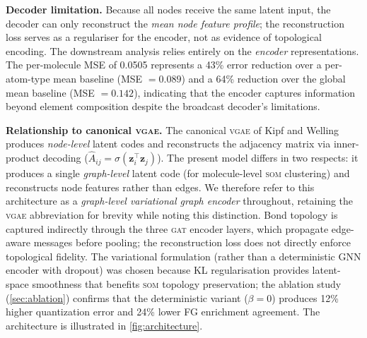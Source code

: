 \documentclass[10pt,a4paper,twocolumn]{article}
\newcommand{\vgae}{\textsc{vgae}}
\newcommand{\gat}{\textsc{gat}}
\newcommand{\som}{\textsc{som}}
\begin{document}
\textbf{Decoder limitation.} Because all nodes receive the same latent input, the decoder can only reconstruct the \emph{mean node feature profile}; the reconstruction loss serves as a regulariser for the encoder, not as evidence of topological encoding. The downstream analysis relies entirely on the \emph{encoder} representations. The per-molecule MSE of 0.0505 represents a 43\% error reduction over a per-atom-type mean baseline (MSE $= 0.089$) and a 64\% reduction over the global mean baseline (MSE $= 0.142$), indicating that the encoder captures information beyond element composition despite the broadcast decoder's limitations.

\textbf{Relationship to canonical \vgae{}.} The canonical \vgae{} of Kipf and Welling~\cite{kipf2016} produces \emph{node-level} latent codes and reconstructs the adjacency matrix via inner-product decoding ($\hat{A}_{ij} = \sigma(\mathbf{z}_i^\top \mathbf{z}_j)$). The present model differs in two respects: it produces a single \emph{graph-level} latent code (for molecule-level \som{} clustering) and reconstructs node features rather than edges. We therefore refer to this architecture as a \emph{graph-level variational graph encoder} throughout, retaining the \vgae{} abbreviation for brevity while noting this distinction. Bond topology is captured indirectly through the three \gat{} encoder layers, which propagate edge-aware messages before pooling; the reconstruction loss does not directly enforce topological fidelity. The variational formulation (rather than a deterministic GNN encoder with dropout) was chosen because KL regularisation provides latent-space smoothness that benefits \som{} topology preservation; the ablation study (\cref{sec:ablation}) confirms that the deterministic variant ($\beta = 0$) produces 12\% higher quantization error and 24\% lower FG enrichment agreement. The architecture is illustrated in \cref{fig:architecture}.
\end{document}
